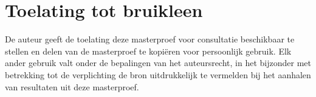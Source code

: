 \chapter*{Toelating tot bruikleen}

De auteur geeft de toelating deze masterproef voor consultatie beschikbaar te stellen en delen van de masterproef te kopiëren voor persoonlijk gebruik.
Elk ander gebruik valt onder de bepalingen van het auteursrecht, in het bijzonder met betrekking tot de verplichting de bron uitdrukkelijk te vermelden bij het aanhalen van resultaten uit deze masterproef.

